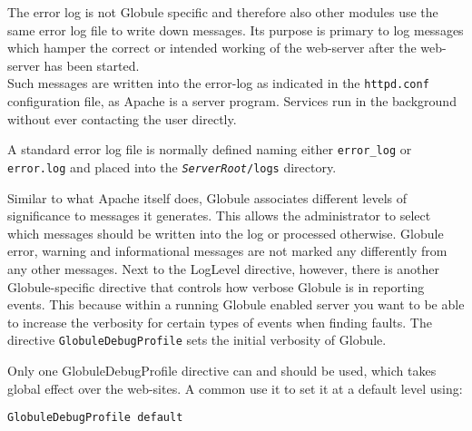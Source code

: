 \documentclass[10pt,a4paper]{article}
\makeatletter
\newenvironment{p}{\@open{P}{}}{\@close{P}}
\newenvironment{p}{}{\par}
\makeatother
\begin{document}
\begin{p}
The error log is not Globule specific and therefore also other modules use the
same error log file to write down messages.  Its purpose is primary to log
messages which hamper the correct or intended working of the web-server after
the web-server has been started. \\
Such messages are written into the error-log as indicated in the
\verb!httpd.conf! configuration file, as Apache is a server program.  Services
run in the background without ever contacting the user directly.
\end{p}

\begin{p}
A standard error log file is normally defined naming either \verb!error_log!
or \verb!error.log! and placed into the \texttt{\textit{ServerRoot}/logs}
directory.
\end{p}

\begin{p}
Similar to what Apache itself does, Globule associates different levels of
significance to messages it generates.  This allows the administrator to
select which messages should be written into the log or processed otherwise.
Globule error, warning and informational messages are not marked any
differently from any other messages.  Next to the LogLevel directive, however,
there is another Globule-specific directive that controls how verbose Globule
is in reporting events.  This because within a running Globule enabled server
you want to be able to increase the verbosity for certain types of events when
finding faults.  The directive \texttt{GlobuleDebugProfile} sets the initial
verbosity of Globule.
\end{p}

\begin{p}
Only one GlobuleDebugProfile directive can and should be used, which takes
global effect over the web-sites.  A common use it to set it at a default
level using:
\end{p}

\begin{Verbatim}
GlobuleDebugProfile default
\end{Verbatim}
\end{document}
